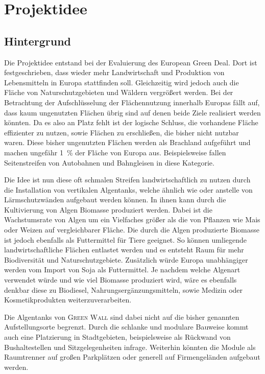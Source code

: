 \chapter{Projektidee}

    \section{Hintergrund}

        Die Projektidee entstand bei der Evaluierung des European Green Deal.
        Dort ist festgeschrieben, dass wieder mehr Landwirtschaft und Produktion von Lebensmitteln in Europa stattfinden soll.
        Gleichzeitig wird jedoch auch die Fläche von Naturschutzgebieten und Wäldern vergrößert werden.
        Bei der Betrachtung der Aufschlüsselung der Flächennutzung innerhalb Europas fällt auf, dass kaum ungenutzten Flächen übrig sind auf denen beide Ziele realisiert werden könnten.
        Da es also an Platz fehlt ist der logische Schluss, die vorhandene Fläche effizienter zu nutzen, sowie Flächen zu erschließen, die bisher nicht nutzbar waren.
        Diese bisher ungenutzten Flächen werden als Brachland aufgeführt und machen ungefähr \qty{1}{\percent} der Fläche von Europa aus.
        Beispielsweise fallen Seitenstreifen von Autobahnen und Bahngleisen in diese Kategorie.\par\medskip
        Die Idee ist nun diese oft schmalen Streifen landwirtschaftlich zu nutzen durch die Installation von vertikalen Algentanks, welche ähnlich wie oder anstelle von Lärmschutzwänden aufgebaut werden können.
        In ihnen kann durch die Kultivierung von Algen Biomasse produziert werden.
        Dabei ist die Wachstumsrate von Algen um ein Vielfaches größer als die von Pflanzen wie Mais oder Weizen auf vergleichbarer Fläche.
        Die durch die Algen produzierte Biomasse ist jedoch ebenfalls als Futtermittel für Tiere geeignet.
        So können umliegende landwirtschaftliche Flächen entlastet werden und es entsteht Raum für mehr Biodiversität und Naturschutzgebiete.
        Zusätzlich würde Europa unabhängiger werden vom Import von Soja als Futtermittel.
        Je nachdem welche Algenart verwendet würde und wie viel Biomasse produziert wird, wäre es ebenfalls denkbar diese zu Biodiesel, Nahrungsergänzungsmitteln, sowie Medizin oder Kosmetikprodukten weiterzuverarbeiten.\par\medskip
        
        Die Algentanks von \textsc{Green Wall} sind dabei nicht auf die bisher genannten Aufstellungsorte begrenzt.
        Durch die schlanke und modulare Bauweise kommt auch eine Platzierung in Stadtgebieten, beispielsweise als Rückwand von Bushaltestellen und Sitzgelegenheiten infrage.
        Weiterhin könnten die Module als Raumtrenner auf großen Parkplätzen oder generell auf Firmengeländen aufgebaut werden.\par\medskip

